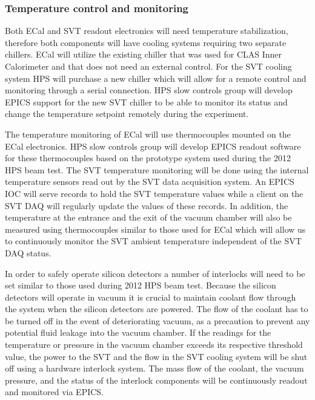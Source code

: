 \subsubsection{Temperature control and monitoring}
\label{sec:ctrl:temp}
Both ECal and SVT readout electronics will need temperature stabilization, therefore both components  
will have cooling systems requiring two separate chillers. ECal will utilize the 
existing chiller that was used for CLAS Inner Calorimeter and that does not need an external 
control. For the SVT cooling system HPS will purchase a new chiller which will allow for a remote control 
and monitoring through a serial connection. HPS slow controls group will develop EPICS support for the new SVT 
chiller to be able to monitor its status and change the temperature setpoint remotely during the experiment.   

The temperature monitoring of ECal will use thermocouples mounted on the ECal electronics. HPS slow controls group will 
develop EPICS readout software for these thermocouples based on the prototype system 
used during the 2012 HPS beam test. The SVT temperature monitoring will be done using the internal temperature 
sensors read out by the SVT data acquisition system. An EPICS IOC will serve records to hold the SVT temperature 
values while a client on the SVT DAQ will regularly update the values of these records. In addition, 
the temperature at the entrance and the exit of the vacuum chamber will also be measured  
using thermocouples similar to those used for ECal which will allow us to continuously monitor the SVT ambient 
temperature independent of the SVT DAQ status.  

In order to safely operate silicon detectors a number of interlocks will need to be set similar to those 
used during 2012 HPS beam test.  Because the silicon detectors will operate in vacuum it is crucial 
to maintain  coolant flow through the system when the silicon detectors are powered. The flow of the 
coolant has to be turned off in the event of deteriorating vacuum, as a precaution to prevent any potential fluid 
leakage into the vacuum chamber. If the readings for the temperature or pressure in the vacuum chamber exceeds its
respective threshold value, the power to the SVT and the flow in the SVT cooling system
will be shut off using a hardware interlock system. The mass flow of the coolant, the vacuum 
pressure, and the status of the interlock components will be continuously readout and monitored via EPICS.

